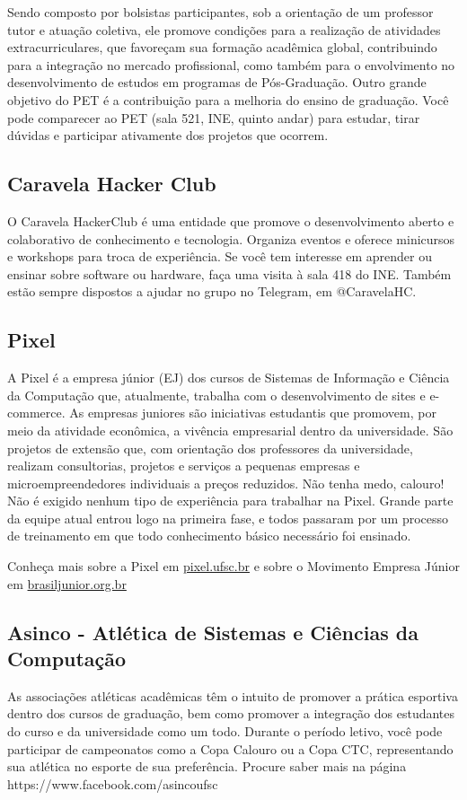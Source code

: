 \documentclass{article}
\begin{document}
Sendo composto por bolsistas participantes, sob a orientação de um professor tutor e atuação coletiva, ele promove condições para a realização de atividades extracurriculares, que favoreçam sua formação acadêmica global, contribuindo para a integração no mercado profissional, como também para o envolvimento no desenvolvimento de estudos em programas de Pós-Graduação. Outro grande objetivo do PET é a contribuição para a melhoria do ensino de graduação.
Você pode comparecer ao PET (sala 521, INE, quinto andar) para estudar, tirar dúvidas e participar ativamente dos projetos que ocorrem.

\subsection{Caravela Hacker Club}
O Caravela HackerClub é uma entidade que promove o desenvolvimento aberto e colaborativo de conhecimento e tecnologia. Organiza eventos e oferece minicursos e workshops para troca de experiência. Se você tem interesse em aprender ou ensinar sobre software ou hardware, faça uma visita à sala 418 do INE. Também estão sempre dispostos a ajudar no grupo no Telegram, em @CaravelaHC.

\subsection{Pixel}
A Pixel é a empresa júnior (EJ) dos cursos de Sistemas de Informação e Ciência da Computação que, atualmente, trabalha com o desenvolvimento de sites e e-commerce. As empresas juniores são iniciativas estudantis que promovem, por meio da atividade econômica, a vivência empresarial dentro da universidade. São projetos de extensão que, com orientação dos professores da universidade, realizam consultorias, projetos e serviços a pequenas empresas e microempreendedores individuais a preços reduzidos. Não tenha medo, calouro! Não é exigido nenhum tipo de experiência para trabalhar na Pixel. Grande parte da equipe atual entrou logo na primeira fase, e todos passaram por um processo de treinamento em que todo conhecimento básico necessário foi ensinado.

Conheça mais sobre a Pixel em \url{pixel.ufsc.br} e sobre o Movimento Empresa Júnior em \url{brasiljunior.org.br}

\subsection{Asinco - Atlética de Sistemas e Ciências da Computação}
As associações atléticas acadêmicas têm o intuito de promover a prática esportiva dentro dos cursos de graduação, bem como promover a integração dos estudantes do curso e da universidade como um todo. Durante o período letivo, você pode participar de campeonatos como a Copa Calouro ou a Copa CTC, representando sua atlética no esporte de sua preferência. Procure saber mais na página https://www.facebook.com/asincoufsc
\end{document}
